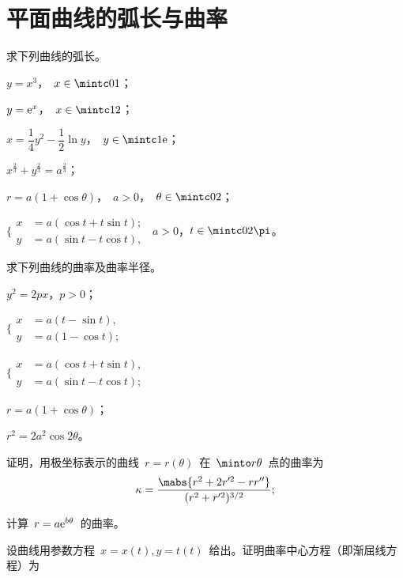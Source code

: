 \section{平面曲线的弧长与曲率}
\begin{exercise}
\item 求下列曲线的弧长。
\begin{exlistcols}
  \item $y=x^3$，~$x\in\mintc 01$；
  \item $y=\mathrm e^x$，~$x\in\mintc 12$；
  \item $x=\dfrac14y^2-\dfrac12\ln y$，~$y\in\mintc 1\me$；
  \item $x^{\frac23}+y^{\frac23}=a^{\frac23}$；
  \item $r=a(1+\cos\theta)$，~$a>0$，~$\theta\in\mintc 02$；
  \item $\Biggl\lbrace\begin{aligned} x&=a(\cos t+t\sin t);\\ y&=a(\sin t-t\cos t),\end{aligned}$~$a>0$，$t\in\mintc0{2\pi}$。
\end{exlistcols}
\item 求下列曲线的曲率及曲率半径。
\begin{exlistcols}[3]
  \item $y^2=2px$，$p>0$；
  \item $\Biggl\lbrace\begin{aligned} x&=a(t-\sin t),\\ y&=a(1-\cos t); \end{aligned}$
  \item $\Biggl\lbrace\begin{aligned} x&=a(\cos t+t\sin t),\\ y&=a(\sin t-t\cos t); \end{aligned}$
  \item $r=a(1+\cos\theta)$；
  \item $r^2=2a^2\cos2\theta$。
\end{exlistcols}
\item\begin{exlist}
  \item 证明，用极坐标表示的曲线~$r=r(\theta)$~在~$\minto r\theta$~点的曲率为
  \[
    \kappa=\frac{\mabs{r^2+2r'^2-rr''}}{(r^2+r'^2)^{\sfrac32}};
  \]
  \item 计算~$r=a\mathrm e^{b\theta}$~的曲率。
\end{exlist}
\item 设曲线用参数方程~$x=x(t),y=t(t)$~给出。证明曲率中心方程（即渐屈线方程）为

\end{exercise}
